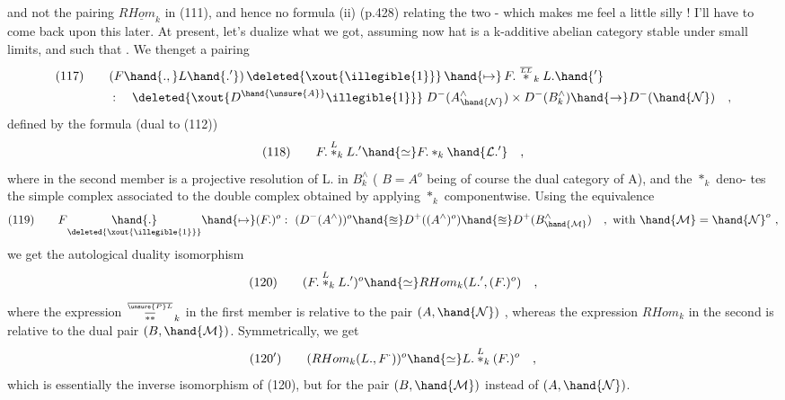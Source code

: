 
and not the pairing $R\underline{Hom}_k$ in (111), and hence no formula (ii) (p.428)
relating the two - which makes me feel a little silly ! I'll have to
come back upon this later.  At present, let's dualize what we
got, assuming now hat  is a k-additive abelian category stable under
small \hand{\uline{\textcolor{black}{direct}}} limits, and such that \hand{\uline{\textcolor{black}{a small direct sum of monomorphisms}}}
. We thenget a pairing
\[ \begin{aligned} (117)\qquad & (F\hand{.,}L\hand{.'})\,\deleted{\xout{\illegible{1}}}\,\hand{\mapsto}\, F.\overset{\over{L}{L}}{*}_k L.\hand{'} \\
& :\quad \deleted{\xout{D^{\hand{\unsure{A}}}\illegible{1}}}\; D^-(A^\wedge_{\hand{\mathcal{N}}}) \times D^-(B^\wedge_k) \hand{\to} D^-(\hand{\mathcal{N}}) \quad , \end{aligned} \]
defined by the formula (dual to (112))
\[ (118)\qquad F.\overset{L}{*}_k L.' \hand{\simeq} F.*_k \hand{\mathcal{L}.'} \quad , \]
where in the second member  is a projective resolution of L. in
$B^\wedge_k$ ( $B = A^o$ being of course the dual category of A), and the $*_k$ deno-%
tes the simple complex associated to the double complex obtained by
applying $*_k$ componentwise. Using the  equivalence
\[ (119)\qquad F\underset{\deleted{\xout{\illegible{1}}}}{\hand{.}}\hand{\mapsto}(F.)^o :\ (D^-(A^\wedge))^o \hand{\approxeq} D^+((A^\wedge)^o) \hand{\approxeq} D^+(B^\wedge_{\hand{\mathcal{M}}}) \quad , \text{ with } \hand{\mathcal{M}} = \hand{\mathcal{N}}^o \ , \]
we get the autological duality isomorphism
\[ (120)\qquad (F.\overset{L}{*}_k L.')^o \hand{\simeq} RHom_k(L.',(F.)^o) \quad , \]
where the expression  $\overset{\over{\unsure{P}}{L}}{\over{*}{*}}_k$ in the first member is relative to the pair
$(A,\hand{\mathcal{N}})$ , whereas the expression $RHom_k$ in the second is relative to the
dual pair $(B,\hand{\mathcal{M}})$. Symmetrically, we get
\[ (120')\qquad (RHom_k(L.,F^{\cdot}))^o \hand{\simeq} L.\overset{L}{*}_k (F.)^o \quad , \]
which is essentially the inverse isomorphism of (120), but for the pair
$(B,\hand{\mathcal{M}})$ instead of $(A,\hand{\mathcal{N}})$.

